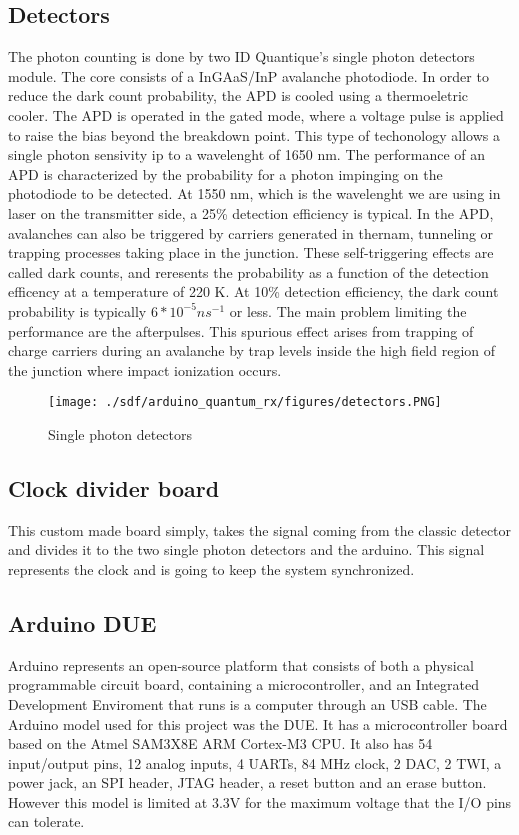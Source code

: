 \begin{refsection}
		\subsection{Detectors}
		The photon counting is done by two ID Quantique's single photon detectors module. The core consists of a InGAaS/InP avalanche photodiode. In order to reduce the dark count probability, the APD is cooled using a thermoeletric cooler. The APD is operated in the gated mode, where a voltage pulse is applied to raise the bias beyond the breakdown point. This type of techonology allows a single photon sensivity ip to a wavelenght of 1650 nm. The performance of an APD is characterized by the probability for a photon impinging on the photodiode to be detected. At 1550 nm, which is the wavelenght we are using in laser on the transmitter side, a 25\% detection efficiency is typical. In the APD, avalanches can also be triggered by carriers generated in thernam, tunneling or trapping processes taking place in the junction. These  self-triggering effects are called dark counts, and reresents the probability as a function of the detection efficency at a temperature of 220 K. At 10\% detection efficiency, the dark count probability is typically  $6* 10^{-5} ns^{-1}$ or less. The main problem limiting the performance are the afterpulses. This spurious effect arises from trapping of  charge carriers during an avalanche by trap levels inside the high field region of the junction where impact ionization occurs.
		
		\begin{figure}[H]
			\centering
			\texttt{[image: ./sdf/arduino\_quantum\_rx/figures/detectors.PNG]}
			\caption{Single photon detectors}
			\label{fig:arduino}
		\end{figure}
		
		
		
		\subsection{Clock divider board}
		This custom made board simply, takes the signal coming from the classic detector and divides it to the two single photon detectors and the arduino. This signal represents the clock and is going to keep the system synchronized.
		
	
	    \subsection{Arduino DUE}
	     Arduino represents an open-source platform that consists of both a physical programmable circuit board, containing a microcontroller, and an  Integrated Development Enviroment that runs is a computer through an USB cable.
	    The Arduino model used for this project was the DUE. It has a microcontroller board based on the Atmel SAM3X8E ARM Cortex-M3 CPU. It also has 54 input/output pins, 12 analog inputs, 4 UARTs, 84 MHz clock, 2 DAC, 2 TWI, a power jack, an SPI header, JTAG header, a reset button and an erase button. However this model is limited at 3.3V for the maximum voltage that the I/O pins can tolerate.  
	    

\end{refsection}
